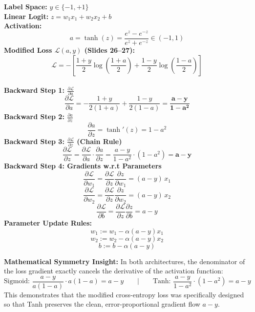 \documentclass[10pt,a4paper]{article}
\begin{document}
\begin{minipage}[t]{0.485\textwidth}
\begin{tcolorbox}[
    colframe=accentred, colback=white, coltitle=white,
    fonttitle=\bfseries\sffamily\small,
    title={Path B: Tanh + Modified Cross-Entropy},
    arc=1.5mm, boxrule=0.6pt, left=5pt, right=5pt, top=3pt, bottom=3pt
]
\small
\textbf{Label Space:} $y \in \{-1, +1\}$\\[2pt]
\textbf{Linear Logit:} $z = w_1 x_1 + w_2 x_2 + b$\\[2pt]
\textbf{Activation:}
\[
a = \tanh(z) = \frac{e^z - e^{-z}}{e^z + e^{-z}} \in (-1, 1)
\]
\textbf{Modified Loss $\mathcal{L}(a, y)$ (Slides 26--27):}
\[
\mathcal{L} = -\left[ \frac{1+y}{2} \log\left(\frac{1+a}{2}\right) + \frac{1-y}{2} \log\left(\frac{1-a}{2}\right) \right]
\]
\hrulefill\\[2pt]
\textbf{Backward Step 1: $\frac{\partial \mathcal{L}}{\partial a}$}
\[
\frac{\partial \mathcal{L}}{\partial a} = -\frac{1+y}{2(1+a)} + \frac{1-y}{2(1-a)} = \mathbf{\frac{a - y}{1 - a^2}}
\]
\textbf{Backward Step 2: $\frac{\partial a}{\partial z}$}
\[
\frac{\partial a}{\partial z} = \tanh'(z) = 1 - a^2
\]
\textbf{Backward Step 3: $\frac{\partial \mathcal{L}}{\partial z}$ (Chain Rule)}
\[
\frac{\partial \mathcal{L}}{\partial z} = \frac{\partial \mathcal{L}}{\partial a} \cdot \frac{\partial a}{\partial z} = \frac{a - y}{1 - a^2} \cdot (1 - a^2) = \mathbf{a - y}
\]
\textbf{Backward Step 4: Gradients w.r.t Parameters}
\[
\frac{\partial \mathcal{L}}{\partial w_1} = \frac{\partial \mathcal{L}}{\partial z} \frac{\partial z}{\partial w_1} = (a - y) \, x_1
\]
\[
\frac{\partial \mathcal{L}}{\partial w_2} = \frac{\partial \mathcal{L}}{\partial z} \frac{\partial z}{\partial w_2} = (a - y) \, x_2
\]
\[
\frac{\partial \mathcal{L}}{\partial b} = \frac{\partial \mathcal{L}}{\partial z} \frac{\partial z}{\partial b} = a - y
\]
\textbf{Parameter Update Rules:}
\[
w_1 := w_1 - \alpha (a - y) x_1
\]
\[
w_2 := w_2 - \alpha (a - y) x_2
\]
\[
b := b - \alpha (a - y)
\]
\end{tcolorbox}
\end{minipage}

\vspace{3pt}

\begin{tcolorbox}[
    colframe=themeblue, colback=lightbg, arc=1.5mm, boxrule=0.5pt,
    left=7pt, right=7pt, top=3pt, bottom=3pt
]
\textbf{Mathematical Symmetry Insight:} In both architectures, the denominator of the loss gradient exactly cancels the derivative of the activation function:
\[
\text{Sigmoid: } \frac{a - y}{a(1 - a)} \cdot a(1 - a) = a - y \qquad\Big\vert\qquad \text{Tanh: } \frac{a - y}{1 - a^2} \cdot (1 - a^2) = a - y
\]
This demonstrates that the modified cross-entropy loss was specifically designed so that Tanh preserves the clean, error-proportional gradient flow $a - y$.
\end{tcolorbox}
\end{document}
